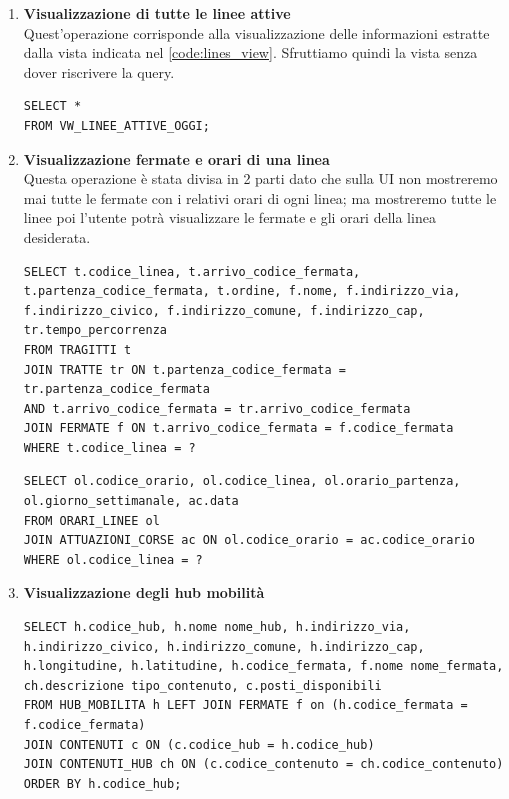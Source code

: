 \documentclass[12pt,a4paper]{report}
\begin{document}
\begin{enumerate}[label=\textbf{\arabic*)}]

\item \textbf{Visualizzazione di tutte le linee attive} \\
Quest'operazione corrisponde alla visualizzazione delle informazioni estratte dalla vista indicata nel \autoref{code:lines_view}. Sfruttiamo quindi la vista senza dover riscrivere la query.\\
\begin{lstlisting}[style=sqlstyle]
SELECT *
FROM VW_LINEE_ATTIVE_OGGI;
\end{lstlisting}

\item \textbf{Visualizzazione fermate e orari di una linea} \\
Questa operazione è stata divisa in 2 parti dato che sulla UI non mostreremo mai tutte le fermate con i relativi orari di ogni linea; ma mostreremo tutte le linee poi l'utente potrà visualizzare le fermate e gli orari della linea desiderata.
\begin{lstlisting}[style=sqlstyle, caption=Query for Fermate Details by Linea]
SELECT t.codice_linea, t.arrivo_codice_fermata, t.partenza_codice_fermata, t.ordine, f.nome, f.indirizzo_via, f.indirizzo_civico, f.indirizzo_comune, f.indirizzo_cap, tr.tempo_percorrenza
FROM TRAGITTI t
JOIN TRATTE tr ON t.partenza_codice_fermata = tr.partenza_codice_fermata
AND t.arrivo_codice_fermata = tr.arrivo_codice_fermata
JOIN FERMATE f ON t.arrivo_codice_fermata = f.codice_fermata
WHERE t.codice_linea = ?
\end{lstlisting}

\begin{lstlisting}[style=sqlstyle, caption=Query for Orari Linee with Attuazioni Corse]
SELECT ol.codice_orario, ol.codice_linea, ol.orario_partenza, ol.giorno_settimanale, ac.data
FROM ORARI_LINEE ol
JOIN ATTUAZIONI_CORSE ac ON ol.codice_orario = ac.codice_orario
WHERE ol.codice_linea = ?
\end{lstlisting}

\item \textbf{Visualizzazione degli hub mobilità} \\
\begin{lstlisting}[style=sqlstyle, caption=Query for Hub Mobilità with Contenuti and Fermate]
SELECT h.codice_hub, h.nome nome_hub, h.indirizzo_via, h.indirizzo_civico, h.indirizzo_comune, h.indirizzo_cap, h.longitudine, h.latitudine, h.codice_fermata, f.nome nome_fermata, ch.descrizione tipo_contenuto, c.posti_disponibili
FROM HUB_MOBILITA h LEFT JOIN FERMATE f on (h.codice_fermata = f.codice_fermata)
JOIN CONTENUTI c ON (c.codice_hub = h.codice_hub)
JOIN CONTENUTI_HUB ch ON (c.codice_contenuto = ch.codice_contenuto)
ORDER BY h.codice_hub;
\end{lstlisting}


\end{enumerate}
\end{document}
